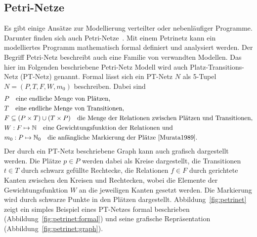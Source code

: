 \subsection{Petri-Netze}\label{sec:petri}
Es gibt einige Ansätze zur Modellierung verteilter oder nebenläufiger Programme. Darunter finden sich auch Petri-Netze~\cite{Murata1989}. Mit einem Petrinetz kann ein modelliertes Programm mathematisch formal definiert und analysiert werden. Der Begriff Petri-Netz beschreibt auch eine Familie von verwandten Modellen. Das hier im Folgenden beschriebene Petri-Netz Modell wird auch Platz-Transitions-Netz (PT-Netz) genannt. Formal lässt sich ein PT-Netz $N$ als 5-Tupel $ N=(P,T,F,W,m_0)$ beschreiben. Dabei sind 
\begin{align*}
	&P  \quad \text{eine endliche Menge von Plätzen,}\\
	&T  \quad \text{eine endliche Menge von Transitionen,}\\
	&F \subseteq (P\times T) \cup (T \times P) \quad \text{die Menge der Relationen zwischen Plätzen und Transitionen,}\\
	&W: F \mapsto \mathbb{N}  \quad \text{eine Gewichtungsfunktion der Relationen und}\\
	&m_0: P \mapsto \mathbb{N}_0   \quad \text{die anfängliche Markierung der Plätze~\cite{Murata1989}.}\\
\end{align*}
Der durch ein PT-Netz beschriebene Graph kann auch grafisch dargestellt werden. Die Plätze $p \in P$ werden dabei als Kreise dargestellt, die Transitionen $ t \in T$ durch schwarz gefüllte Rechtecke, die Relationen $ f \in F$ durch gerichtete Kanten zwischen den Kreisen und Rechtecken, wobei die Elemente der Gewichtungsfunktion $W$ an die jeweiligen Kanten gesetzt werden. Die Markierung wird durch schwarze Punkte in den Plätzen dargestellt. Abbildung~\vref{fig:petrinet} zeigt ein simples Beispiel eines PT-Netzes  formal beschrieben (Abbildung~\vref{fig:petrinet:formal}) und seine grafische Repräsentation (Abbildung~\vref{fig:petrinet:graph}).
